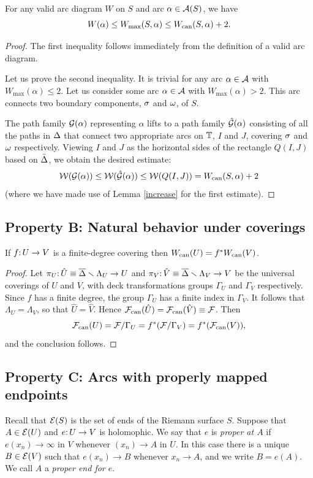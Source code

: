 \begin{lem}\label{max}
   For any valid arc diagram $W$ on $S$ and arc $\alpha\in {\mathcal A}(S)$, we have
$$
   W(\alpha) \leq W_{{\mathrm{max}}}(S, \alpha)\leq  W_{\mathrm{can}}(S, \alpha)  + 2.
$$
 \end{lem}

\begin{proof}
  The first inequality follows immediately from the definition of a valid arc diagram.
  
Let us prove the second inequality. 
  It is trivial for any arc $\alpha\in {\mathcal A}$ with $W_\max(\alpha)\leq 2$.
Let us consider some arc $\alpha\in {\mathcal A}$ with $W_\max(\alpha)>2$.
This arc connects two boundary components, ${\sigma}$ and ${\omega}$, of $S$.

The path family ${\mathcal G}(\alpha)$ representing $\alpha$
lifts to a path family $\hat {{\mathcal G}}(\alpha)$
consisting of all the paths in $\Delta$ that connect
two appropriate arcs on ${\Bbb T} $,  $I$ and $J$,  covering  ${\sigma}$ and ${\omega}$ respectively.
Viewing $ I$ and $ J$
as the horizontal sides of the rectangle $Q(I, J)$ based on $\bar {\Delta}$,
we obtain the desired estimate:
$$
       {\mathcal W}({\mathcal G}(\alpha))\leq {\mathcal W}(\hat{{\mathcal G}}(\alpha))\leq {\mathcal W}(Q(I,  J) ) = W_{\mathrm{can}}(S, \alpha)+2
$$
(where we have made use of Lemma \ref{increase} for the first estimate).
\end{proof}

\subsection{Property B: Natural behavior under coverings}


\begin{lem}\label{cov}
   If $f\mathpunct: U\rightarrow V$ is a finite-degree covering then $W_{\mathrm{can}}(U)= f^* W_{\mathrm{can}}(V)$.
\end{lem}

\begin{proof}
  Let $\pi_U\mathpunct: \hat U\equiv \overline{\Delta}\smallsetminus \Lambda_U\rightarrow U$ and $\pi_V\mathpunct: \hat V\equiv \overline{\Delta}\smallsetminus \Lambda_V\rightarrow V$
 be the universal  coverings of $U$ and $V$, with deck transformations groups $\Gamma_U$ and $\Gamma_V$ respectively.
Since $f$ has a finite degree,
the group $\Gamma_U$ has a finite index in $\Gamma_V$.
It follows that $\Lambda_U=\Lambda_V$, so that $\hat U=\hat V$.
Hence ${\mathcal F}_{\mathrm{can}}(\hat U)=  {\mathcal F}_{\mathrm{can}} (\hat V)\equiv {\mathcal F}$.
Then
$$
 {\mathcal F}_{\mathrm{can}} (U) ={\mathcal F}/\Gamma_U = f^* ({\mathcal F}/\Gamma_V)= f^* ({\mathcal F}_{\mathrm{can}}(V)),
$$
and the conclusion follows.
\end{proof}

\subsection{Property C: Arcs with properly mapped endpoints}
Recall that ${\mathcal E}(S)$ is the set of ends of the Riemann surface $S$.
Suppose that $A \in {\mathcal E}(U)$ and $e\mathpunct: U \to V$ is holomophic. 
We say that $e$ is \emph{proper at $A$} if $e(x_n) \to \infty$ in $V$ whenever $(x_n) \to A$ in $U$. 
In this case there is a unique $B \in {\mathcal E}(V)$ such that $e(x_n) \to B$ whenever $x_n \to A$,
and we write $B = e(A)$. 
We call $A$ a \emph{proper end for $e$}. 

